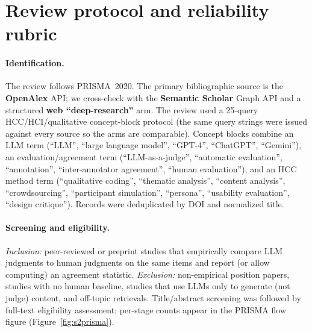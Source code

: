 \appendix
\section{Review protocol and reliability rubric}\label{app:protocol}
\paragraph{Identification.} The review follows PRISMA~2020. The primary bibliographic source is the
\textbf{OpenAlex} API; we cross-check with the \textbf{Semantic Scholar} Graph API and a structured
\textbf{web ``deep-research''} arm. The review used a
25-query HCC/HCI/qualitative concept-block protocol (the same query strings were issued against every source so the
arms are comparable). Concept blocks combine an LLM term (``LLM'', ``large language model'', ``GPT-4'', ``ChatGPT'',
``Gemini''), an evaluation/agreement term (``LLM-as-a-judge'', ``automatic evaluation'', ``annotation'', ``inter-annotator
agreement'', ``human evaluation''), and an HCC method term (``qualitative coding'', ``thematic analysis'',
``content analysis'', ``crowdsourcing'', ``participant simulation'', ``persona'', ``usability evaluation'', ``design
critique''). Records were deduplicated by DOI and normalized title.

\paragraph{Screening and eligibility.} \emph{Inclusion:} peer-reviewed or preprint studies that empirically compare
LLM judgments to human judgments on the same items and report (or allow computing) an agreement statistic.
\emph{Exclusion:} non-empirical position papers, studies with no human baseline, studies that use LLMs only to
generate (not judge) content, and off-topic retrievals. Title/abstract screening was followed by full-text
eligibility assessment; per-stage counts appear in the PRISMA flow figure (Figure~\ref{fig:s2prisma}).

